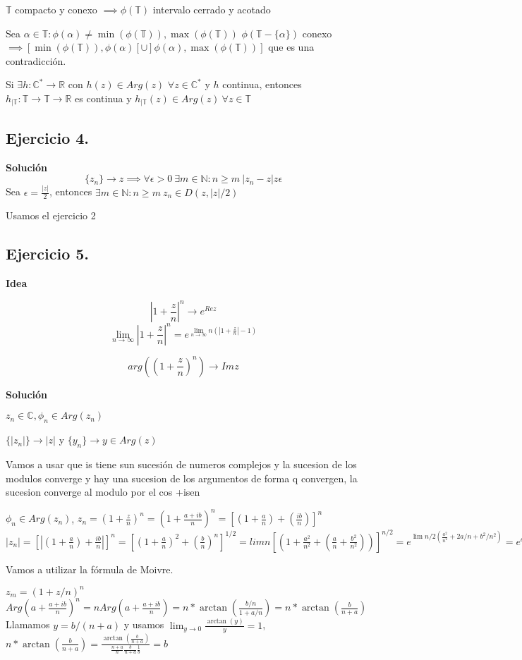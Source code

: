 $\mathbb{T}$ compacto y conexo $\implies \phi(\mathbb{T})$ intervalo cerrado y acotado

Sea $\alpha\in\mathbb{T} : \phi(\alpha) \not =\min(\phi(\mathbb{T})), \max(\phi(\mathbb{T}))$ 
$\phi ( \mathbb{T}-\{ \alpha \} )$ conexo $\implies [ \min(\phi(\mathbb{T})), \phi(\alpha)[ \cup ]\phi(\alpha), \max( \phi(\mathbb{T}) ) ] $ que es una contradicción.

Si $\exists h:\mathbb{C}^{\ast} \rightarrow \mathbb{R}$ con $h(z)\in Arg(z)$ $\forall z\in\mathbb{C}^{\ast}$ y $h$ continua, entonces
$h_{| \mathbb{T}} : \mathbb{T} \rightarrow \mathbb{T} \rightarrow \mathbb{R}$ es continua y $h_{|\mathbb{T}} (z) \in Arg(z) \ \forall z\in\mathbb{T}$



\subsection{Ejercicio 4.}


\textbf{Solución}
$$
\{ z_n \} \rightarrow z \implies \forall \epsilon>0\ \exists m\in\mathbb{N} : n\geq m \ |z_n-z|z\epsilon
$$
Sea $\epsilon = \frac{|z|}{2}$, entonces 
$\exists m\in\mathbb{N} :  n\geq m\ z_n\in D(z, |z|/2)$

Usamos el ejercicio 2




\subsection{Ejercicio 5.}


\textbf{Idea}


$$
|1+\frac{z}{n}|^n \rightarrow e^{Re z}
$$
$$
\lim_{n\rightarrow\infty} |1+\frac{z}{n}|^n 
= e^{ \lim_{n\rightarrow\infty} n(|1+\frac{z}{n}|-1) }
$$

$$
arg((1+\frac{z}{n})^n) \rightarrow Im z
$$

\textbf{Solución}

$z_n\in\mathbb{C}, \phi_n\in Arg(z_n)$

$\{ |z_n| \} \rightarrow |z|$ y $\{y_n\} \rightarrow y\in Arg(z)$

Vamos a usar que is tiene sun sucesión de numeros complejos y la sucesion de los modulos converge y hay una sucesion de los argumentos de forma q convergen, la sucesion converge al modulo por el cos +isen

$\phi_n \in Arg(z_n)$, $z_n = (1+\frac{z}{n})^n = (1+\frac{a+ib}{n})^n
= [(1+\frac{a}{n}) + (\frac{ib}{n})] ^n$
$|z_n| = [| (1+\frac{a}{n}) + \frac{ib}{n} |] ^n
= [ (1+\frac{a}{n})^2 + (\frac{b}{n})^n ]^{1/2}
= lim n [ (1+\frac{a^2}{n^2} + (\frac{a}{n}+\frac{b^2}{n^2}) )]^{n/2}
= e^{  \lim n/2 (\frac{a^2}{n^2} + 2a/n + b^2/n^2 )  } = e^a = e^{Re z}$ 

Vamos a utilizar la fórmula de Moivre.

$ z_m = (1+z/n)^n$
$Arg(a+ \frac{a+ib}{n})^n = n Arg(a+\frac{a+ib}{n}) = n*\arctan (\frac{b/n}{1+a/n}) = n*\arctan(\frac{b}{n+a})$
Llamamos $y=b/(n+a)$ y usamos $\lim_{y\rightarrow0} \frac{\arctan(y)}{y} = 1$,
$n*\arctan(\frac{b}{n+a}) = \frac{\arctan(\frac{b}{n+a})}{ \frac{n+a}{n}\frac{b}{n+a}\frac{1}{b} } = b$